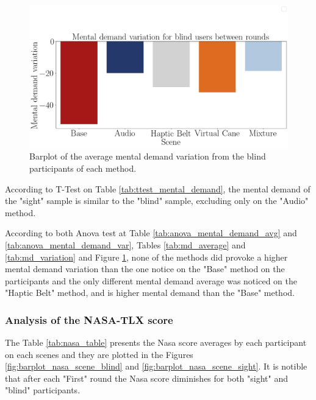 \begin{figure}[!htb]
    \centering
    \includegraphics[width = 0.8\linewidth]{Resultados/Nasa/Figuras/png/barplot_md_var_scene_blind.png}
    \caption{Barplot of the average mental demand variation from the blind participants of each method.}
    \label{fig:barplot_md_var_scene_blind}
\end{figure}

According to T-Test on Table \ref{tab:ttest_mental_demand}, the mental demand of the "sight" sample is similar to the "blind" sample, excluding only on the "Audio" method.

According to both Anova test at Table \ref{tab:anova_mental_demand_avg} and \ref{tab:anova_mental_demand_var}, Tables \ref{tab:md_average} and \ref{tab:md_variation} and Figure \ref{fig:barplot_md_var_scene_blind}, none of the methods did provoke a higher mental demand variation than the one notice on the "Base" method on the participants and the only different mental demand average was noticed on the "Haptic Belt" method, and is higher mental demand than the "Base" method.

\FloatBarrier



\subsubsection{Analysis of the NASA-TLX score}

The Table \ref{tab:nasa_table} presents the Nasa score averages by each participant on each scenes and they are plotted in the Figures \ref{fig:barplot_nasa_scene_blind} and \ref{fig:barplot_nasa_scene_sight}. It is notible that after each "First" round the Nasa score diminishes for both "sight" and "blind" participants.

